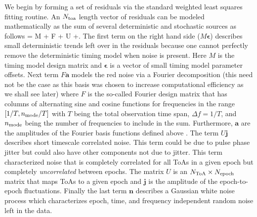 We begin by forming a set of residuals via the standard weighted least squares fitting routine. An $N_{\rm toa}$ length vector of  residuals can be modeled mathematically as the sum of several deterministic and stochastic sources as follows
\be
\delta{} = M\boldsymbol{\epsilon} + F + U +.
\ee
The first term on the right hand side ($M\boldsymbol{\epsilon}$) describes small deterministic trends
left over in the residuals because one cannot perfectly remove the
deterministic timing model when noise is present. Here $M$ is the timing model
design matrix and $\boldsymbol{\epsilon}$ is a vector of small timing model
parameter offsets. Next term $F\mathbf{a}$ models the red noise via a Fourier decomposition
(this need not be the case as this basis was chosen to increase computational
efficiency as we shall see later) where $F$ is the so-called Fourier design
matrix that has columns of alternating sine and cosine functions for
frequencies in the range $[1/T,n_{\rm mode}/T]$ with $T$ being 
the total observation time span, $\Delta f=1/T$, and
$n_{\rm mode}$ being the number of frequencies to include in the sum.
Furthermore, $\mathbf{a}$ are the amplitudes of the Fourier basis functions
defined above \citep[see][for more details]{lah+13,abb+14}. 
The term $U\mathbf{j}$ describes short timescale correlated noise. This term could be due to pulse
phase jitter but could also have other components not due to jitter. This term
characterized noise that is completely correlated for all ToAs in a given
epoch but completely \emph{uncorrelated} between epochs. The matrix $U$ is an
$N_{\rm ToA}\times N_{\rm epoch}$ matrix that maps ToAs to a given epoch and
$\mathbf{j}$ is the amplitude of the epoch-to-epoch fluctuations. Finally the
last term $\mathbf{n}$ describes a Gaussian white noise process which
characterizes epoch, time, and frequency independent random noise left in the data. 


